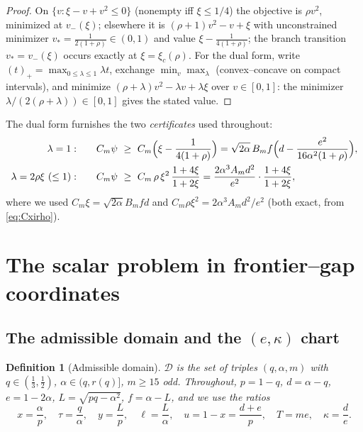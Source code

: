 \documentclass[11pt]{article}
\newtheorem{definition}[theorem]{Definition}
\newcommand{\pos}[1]{\left(#1\right)_{+}}
\begin{document}
\begin{proof}
On $\{v:\xi-v+v^2\le0\}$ (nonempty iff $\xi\le1/4$) the objective is $\rho v^2$,
minimized at $v_-(\xi)$; elsewhere it is $(\rho+1)v^2-v+\xi$ with unconstrained
minimizer $v_*=\frac1{2(1+\rho)}\in(0,1)$ and value $\xi-\frac1{4(1+\rho)}$;
the branch transition $v_*=v_-(\xi)$ occurs exactly at $\xi=\xi_c(\rho)$.
For the dual form, write $\pos t=\max_{0\le\lambda\le1}\lambda t$, exchange
$\min_v\max_\lambda$ (convex--concave on compact intervals), and minimize
$(\rho+\lambda)v^2-\lambda v+\lambda\xi$ over $v\in[0,1]$: the minimizer
$\lambda/(2(\rho+\lambda))\in[0,1]$ gives the stated value.
\end{proof}

The dual form furnishes the two \emph{certificates} used throughout:
\begin{align}
\lambda=1:&\qquad
        C_m\psi\ \ge\ C_m\Bigl(\xi-\frac1{4(1+\rho)}\Bigr)
        =\sqrt{2\alpha}\,B_mf\Bigl(d-\frac{e^2}{16\alpha^2(1+\rho)}\Bigr),
        \label{eq:cert-II}\\
\lambda=2\rho\xi\ (\le1):&\qquad
        C_m\psi\ \ge\ C_m\,\rho\,\xi^2\,\frac{1+4\xi}{1+2\xi}
        =\frac{2\alpha^3A_md^2}{e^2}\cdot\frac{1+4\xi}{1+2\xi},
        \label{eq:cert-I}
\end{align}
where we used $C_m\xi=\sqrt{2\alpha}B_mfd$ and
$C_m\rho\xi^2=2\alpha^3A_md^2/e^2$ (both exact, from
\eqref{eq:Cxirho}).

\section{The scalar problem in frontier--gap coordinates}\label{sec:coords}

\subsection{The admissible domain and the $(e,\kappa)$ chart}

\begin{definition}[Admissible domain]\label{def:domain}
$\mathcal D$ is the set of triples $(q,\alpha,m)$ with $q\in(\tfrac13,\tfrac12)$,
$\alpha\in(q,r(q)]$, $m\ge15$ odd.  Throughout, $p=1-q$, $d=\alpha-q$,
$e=1-2\alpha$, $L=\sqrt{pq-\alpha^2}$, $f=\alpha-L$, and we use the ratios
\[
        x=\frac\alpha p,\quad
        \tau=\frac q\alpha,\quad
        y=\frac Lp,\quad
        \ell=\frac L\alpha,\quad
        u=1-x=\frac{d+e}{p},\quad
        T=me,\quad
        \kappa=\frac de .
\]
\end{definition}
\end{document}
